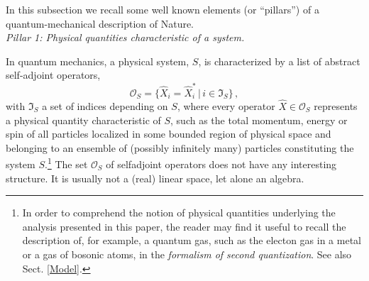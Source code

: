 \documentclass[12pt]{article}
\begin{document}
In this subsection we recall some well known elements (or ``pillars'') of a quantum-mechanical description of Nature.\\

\textit{{Pillar 1}: Physical quantities characteristic of a system.}

In quantum mechanics, a physical system, $S$, is characterized by a list of abstract self-adjoint operators,
\begin{equation}\label{phys quantities}
\mathcal{O}_{S}= \big\{\hat{X}_i = \hat{X}^{*}_i\,\vert\, i \in \mathfrak{I}_S\big\}\,,
\end{equation}
with $\mathfrak{I}_S$ a set of indices depending on $S$, where every operator $\hat{X} \in \mathcal{O}_S$ represents a 
physical quantity characteristic of $S$, such as the total momentum, energy or spin of all particles localized in some bounded 
region of physical space and belonging to an ensemble of (possibly infinitely many) particles constituting the system $S$.\footnote{In order to comprehend the notion of physical quantities underlying the analysis presented in this paper, the reader 
may find it useful to recall the description of, for example, a quantum gas, such as the electon gas in a metal or a gas of 
bosonic atoms, in the \textit{formalism of second quantization}. See also Sect. \ref{Model}.} The set $\mathcal{O}_S$ of selfadjoint operators does not have any interesting structure. It is usually not a (real) linear space, let alone an algebra. 
\end{document}
